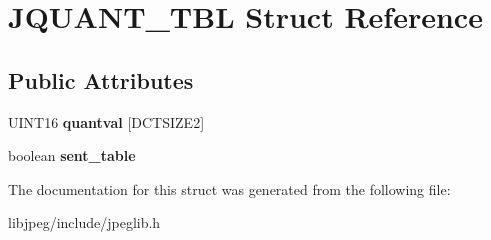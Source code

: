 \hypertarget{structJQUANT__TBL}{\section{J\-Q\-U\-A\-N\-T\-\_\-\-T\-B\-L Struct Reference}
\label{structJQUANT__TBL}
}
\subsection*{Public Attributes}
\begin{DoxyCompactItemize}
\item 
\hypertarget{structJQUANT__TBL_ab2775ab63a4311a8ed446c35fb3847dd}{U\-I\-N\-T16 {\bfseries quantval} \mbox{[}D\-C\-T\-S\-I\-Z\-E2\mbox{]}}\label{structJQUANT__TBL_ab2775ab63a4311a8ed446c35fb3847dd}

\item 
\hypertarget{structJQUANT__TBL_a218b782157eccfbd22023ae6bb4cc7fa}{boolean {\bfseries sent\-\_\-table}}\label{structJQUANT__TBL_a218b782157eccfbd22023ae6bb4cc7fa}

\end{DoxyCompactItemize}


The documentation for this struct was generated from the following file\-:\begin{DoxyCompactItemize}
\item 
libjpeg/include/jpeglib.\-h\end{DoxyCompactItemize}
